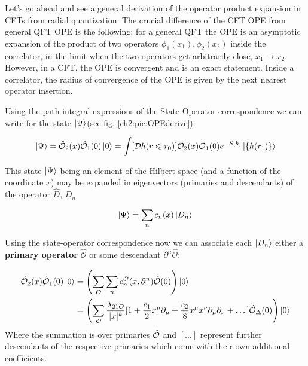   Let's go ahead and see a general derivation of the operator product expansion in CFTs from radial quantization. The crucial difference of the CFT OPE from general QFT OPE is the following: for a general QFT the OPE is an asymptotic expansion of the product of two operators $\phi_1(x_1), \phi_2(x_2)$ inside the correlator, in the limit when the two operators get arbitrarily close, $x_1 \to x_2$. However, in a CFT, the OPE is convergent and is an exact statement. Inside a correlator, the radius of convergence of the OPE is given by the next nearest operator insertion.
  
  
  
  Using the path integral expressions of the State-Operator correspondence we can write for the state $\ket{\Psi}$(see fig. \ref{ch2:pic:OPEderive}):
  
  \begin{align}
   \ket{\Psi} = \hat{\mathcal{O}}_2(x) \hat{\mathcal{O}}_1(0) \ket{0} =\int [\mathcal{D}h(r\leqslant r_0)] \mathcal{O}_2(x) \mathcal{O}_1(0) e^{-S[h]} \ket{\{h(r_1)\}}
  \end{align}

  
  
  This state $\ket{\Psi}$ being an element of the Hilbert space (and a function of the coordinate $x$) may be expanded in eigenvectors (primaries and descendants) of the operator $\hat D$, $D_n$
  
  \begin{align}
   \ket{\Psi} = \sum_{n} c_n(x) \ket{D_n}
  \end{align}

  Using the state-operator correspondence now we can associate each $\ket{D_n}$ either a \textbf{primary operator}  $\hat{\mathcal{O}}$ or some descendant $\partial^n \hat{\mathcal{O}}$:
  
  \begin{align} 
   \hat{\mathcal{O}}_2(x) \hat{\mathcal{O}}_1(0) \ket{0} &= \left(\sum_{{\mathcal{O}}} \sum_{n} c^{\mathcal{O}}_n(x,\partial^n) \hat{\mathcal{O}}(0) \right) \ket{0} \label{ch2:OPE_proof_1} \\
   &=\left(\sum_{{\mathcal{O}}}  \frac{\lambda_{21\mathcal{O}}}{|x|^k} [1+\frac{c_1}{2} x^\mu \partial_\mu +\frac{c_2}{8} x^\mu x^\nu \partial_\mu \partial_\nu + \dots]\hat{\mathcal{{O}}}_{\Delta}(0) \right) \ket{0} \label{ch2:OPE_proof_2}
  \end{align}
  Where the summation is over primaries $\hat{\mathcal{{O}}}$ and $[\dots]$ represent further descendants of the respective primaries which come with their own additional coefficients.

